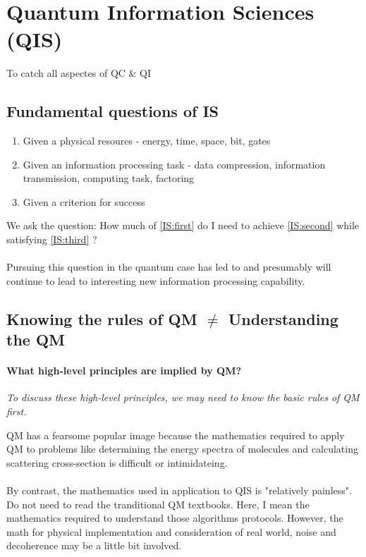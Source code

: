 \documentclass[]{article}
\theoremstyle{nonumberplain}
\begin{document}
\section{Quantum Information Sciences (QIS)}%
\label{sec:quantum_information_sciences}
To catch all aspectes of QC \& QI
\subsection{Fundamental questions of IS}
\begin{enumerate}
	\item \label{IS:first} Given a physical resoures - energy, time, space, bit, gates
	\item \label{IS:second} Given an information processing task - data compression, information transmission, computing task, factoring
	\item \label{IS:third} Given a criterion for success
\end{enumerate}
We ask the question: How much of \ref{IS:first} do I need to achieve \ref{IS:second} while satisfying \ref{IS:third} ?
\\
\\
Pursuing this question in the quantum case has led to and presumably will continue to lead to interesting new information processing capability.
\subsection{Knowing the rules of QM $\neq$ Understanding the QM}
\paragraph{\textbf{What high-level principles are implied by QM?}}%
\begin{center}
	\textit{To discuss these high-level principles, we may need to know the basic rules of QM first.}\\
\end{center}
QM has a fearsome popular image because the mathematics required to apply QM to problems like determining the energy spectra of molecules and calculating scattering cross-section is difficult or intimidateing.\\
\\
By contrast, the mathematics used in application to QIS is "relatively painless". Do not need to read the tranditional QM textbooks. Here, I mean the mathematics required to understand those algorithms protocols. However, the math for physical implementation and consideration of real world, noise and decoherence may be a little bit involved.\\
\end{document}
